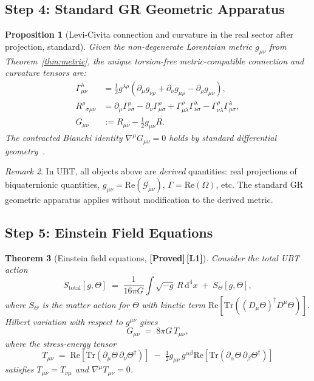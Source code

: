 \documentclass[12pt,a4paper]{article}
\newtheorem{theorem}{Theorem}[section]
\newtheorem{proposition}[theorem]{Proposition}
\theoremstyle{definition}
\theoremstyle{remark}
\newtheorem{remark}[theorem]{Remark}
\newcommand{\PROVED}{\textbf{[Proved]}}
\newcommand{\Lone}{\textbf{[L1]}}
\newcommand{\Tr}{\mathrm{Tr}}
\newcommand{\re}{\mathrm{Re}}
\newcommand{\calG}{\mathcal{G}}
\begin{document}
\subsection{Step 4: Standard GR Geometric Apparatus}
\label{sec:step4}

\begin{proposition}[Levi-Civita connection and curvature in the real sector after projection, standard]
\label{prop:geometry}
Given the non-degenerate Lorentzian metric $g_{\mu\nu}$ from
Theorem~\ref{thm:metric}, the unique torsion-free metric-compatible connection
and curvature tensors are:
\begin{align}
  \Gamma^\lambda_{\mu\nu}
    &= \tfrac{1}{2}g^{\lambda\rho}
       (\partial_\mu g_{\nu\rho} + \partial_\nu g_{\mu\rho}
        - \partial_\rho g_{\mu\nu}), \\
  R^\rho{}_{\sigma\mu\nu}
    &= \partial_\mu\Gamma^\rho_{\nu\sigma}
       - \partial_\nu\Gamma^\rho_{\mu\sigma}
       + \Gamma^\rho_{\mu\lambda}\Gamma^\lambda_{\nu\sigma}
       - \Gamma^\rho_{\nu\lambda}\Gamma^\lambda_{\mu\sigma}, \\
  G_{\mu\nu}
    &:= R_{\mu\nu} - \tfrac{1}{2}g_{\mu\nu}R.
\end{align}
The contracted Bianchi identity $\nabla^\mu G_{\mu\nu} = 0$ holds by standard
differential geometry~\cite{wald1984,mtw1973}.
\end{proposition}

\begin{remark}
In UBT, all objects above are \emph{derived} quantities: real projections of
biquaternionic quantities,
$g_{\mu\nu} = \re(\calG_{\mu\nu})$,
$\Gamma = \re(\Omega)$, etc.
The standard GR geometric apparatus applies without modification to the
derived metric.
\end{remark}

\subsection{Step 5: Einstein Field Equations}
\label{sec:step5}

\begin{theorem}[Einstein field equations, \PROVED\,\Lone]
\label{thm:einstein}
Consider the total UBT action
\[
  S_{\mathrm{total}}[g,\Theta]
  \;=\; \frac{1}{16\pi G}\int\!\!\sqrt{-g}\,R\,\mathrm{d}^4x
  \;+\; S_\Theta[g,\Theta],
\]
where $S_\Theta$ is the matter action for $\Theta$ with kinetic term
$\re[\Tr((D_\mu\Theta)^\dagger D^\mu\Theta)]$.
Hilbert variation with respect to $g^{\mu\nu}$ gives
\[
  G_{\mu\nu} \;=\; 8\pi G\,T_{\mu\nu},
\]
where the stress-energy tensor
\[
  T_{\mu\nu}
  \;=\; \re[\Tr(\partial_\mu\Theta\,\partial_\nu\Theta^\dagger)]
  \;-\; \tfrac{1}{2}g_{\mu\nu}\,g^{\alpha\beta}
        \re[\Tr(\partial_\alpha\Theta\,\partial_\beta\Theta^\dagger)]
\]
satisfies $T_{\mu\nu} = T_{\nu\mu}$ and $\nabla^\mu T_{\mu\nu} = 0$.
\end{theorem}
\end{document}
